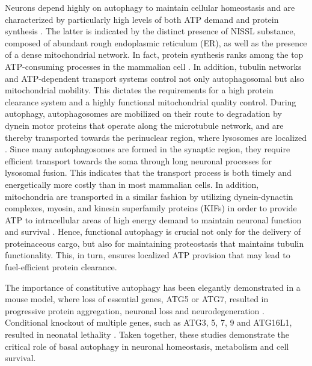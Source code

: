 Neurons depend highly on autophagy to maintain cellular homeostasis and are characterized by particularly high levels of both ATP demand and protein synthesis \citep{Meijer2009,Son2012}. The latter is indicated by the distinct presence of NISSL substance, composed of abundant rough endoplasmic reticulum (ER), as well as the presence of a dense mitochondrial network. In fact, protein synthesis ranks among the top ATP-consuming processes in the mammalian cell 
\citep{Buttgereit1995}. In addition, tubulin networks and ATP-dependent transport systems control not only autophagosomal but also mitochondrial mobility. This dictates the requirements for a high protein clearance system and a highly functional mitochondrial quality control. During autophagy, autophagosomes are mobilized on their route to degradation by dynein motor proteins that operate along the microtubule network, and are thereby transported towards the perinuclear region, where lysosomes are localized \citep{Fass2006,Jahreiss2008,Kimura2008}. Since many autophagosomes are formed in the synaptic region, they require efficient transport towards the soma through long neuronal processes for lysosomal fusion. This indicates that the transport process is both timely and energetically more costly than in most mammalian cells. In addition, mitochondria are transported in a similar fashion by utilizing dynein-dynactin complexes, myosin, and kinesin superfamily proteins (KIFs) in order to provide ATP to intracellular areas of high energy demand to maintain neuronal function and survival \citep{Lin2015,Sheng2012}. Hence, functional autophagy is crucial not only for the delivery of proteinaceous cargo, but also for maintaining proteostasis that maintains tubulin functionality. This, in turn, ensures localized ATP provision that may lead to fuel-efficient protein clearance. 

The importance of constitutive autophagy has been elegantly demonstrated in a mouse model, where loss of essential genes, ATG5 or ATG7, resulted in progressive protein aggregation, neuronal loss and neurodegeneration \citep{Hara2006,Komatsu2006}. Conditional knockout of multiple genes, such as ATG3, 5, 7, 9 and ATG16L1, resulted in neonatal lethality \citep{Mizushima2010}. Taken together, these studies demonstrate the critical role of basal autophagy in neuronal homeostasis, metabolism and cell survival. 

